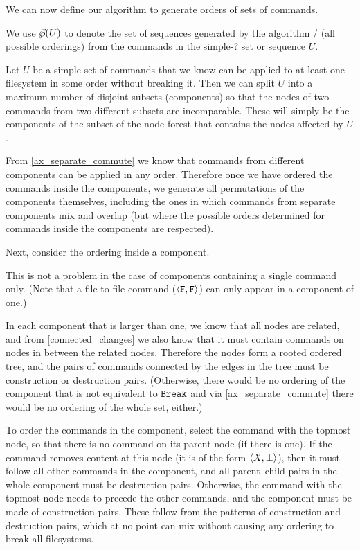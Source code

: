 \bigskip

\noindent
We can now define our algorithm to generate orders of sets of commands.

\begin{mydef}[$\ordersetsign$]
We use $\vec{\wp}({U})$ to denote the set of sequences 
generated by the algorithm / (all possible orderings)
from the commands in the simple-? set or sequence $U$.
\end{mydef}

Let $U$ be a simple set of commands
that we know can be applied to at least one filesystem in some order without breaking it.
Then we can split $U$ into a maximum number of disjoint subsets
(components) so that the nodes of two commands from two different subsets are incomparable.
These will simply be the components of the subset of the node forest that contains 
the nodes affected by $U$.

From \cref{ax_separate_commute} we know that commands from different 
components can be applied in any order.
Therefore once we have ordered the commands inside the components, we generate
all permutations of the components themselves, including the ones
in which commands from separate components mix and overlap
(but where the possible orders determined for commands inside the components are respected).

Next, consider the ordering inside a component.

This is not a problem in the case of components containing a single command only.
(Note that a file-to-file command ($\langle{\mathtt{F},\mathtt{F}}\rangle$) can only appear in a component of one.)

In each component that is larger than one, 
we know that all nodes are related, and from \cref{connected_changes}
we also know that it must contain commands on nodes in between the related nodes.
Therefore the nodes
form a rooted ordered tree,
and the pairs of commands connected by the edges in the tree 
must be construction or destruction pairs.
(Otherwise, there would be no ordering of the component that is not equivalent to $\mathtt{Break}$
and via \cref{ax_separate_commute} there would be no ordering of the whole set, either.)

To order the commands in the component,
select the command with the topmost node, so that there is no command
on its parent node (if there is one). 
If the command removes content at this node (it is of the form $\langle{X,\bot}\rangle$), 
then it must follow all other commands in the component, and
all parent--child pairs in the whole component must be destruction pairs.
Otherwise, the command with the topmost node needs to precede the other commands,
and the component must be made of construction pairs.
These follow from the patterns of construction and destruction pairs, which
at no point can mix without causing any ordering to break all filesystems.

